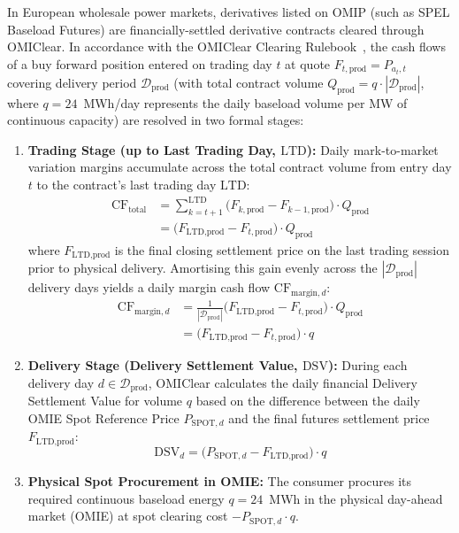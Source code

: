 In European wholesale power markets, derivatives listed on OMIP (such as SPEL Baseload Futures) are financially-settled derivative contracts cleared through OMIClear. In accordance with the OMIClear Clearing Rulebook~\cite{omiclear2023rulebook}, the cash flows of a buy forward position entered on trading day $t$ at quote $F_{t, \text{prod}} = P_{a_t, t}$ covering delivery period $\mathcal{D}_{\text{prod}}$ (with total contract volume $Q_{\text{prod}} = q \cdot |\mathcal{D}_{\text{prod}}|$, where $q = 24$~MWh/day represents the daily baseload volume per MW of continuous capacity) are resolved in two formal stages:
\begin{enumerate}
    \item \textbf{Trading Stage (up to Last Trading Day, $\text{LTD}$):} Daily mark-to-market variation margins accumulate across the total contract volume from entry day $t$ to the contract's last trading day $\text{LTD}$:
    \begin{equation}
    \begin{aligned}
        \text{CF}_{\text{total}} &= \sum_{k=t+1}^{\text{LTD}} \big( F_{k, \text{prod}} - F_{k-1, \text{prod}} \big) \cdot Q_{\text{prod}} \\
        &= \big( F_{\text{LTD}, \text{prod}} - F_{t, \text{prod}} \big) \cdot Q_{\text{prod}}
    \end{aligned}
    \label{eq:cfd_trading_stage}
    \end{equation}
    where $F_{\text{LTD}, \text{prod}}$ is the final closing settlement price on the last trading session prior to physical delivery. Amortising this gain evenly across the $|\mathcal{D}_{\text{prod}}|$ delivery days yields a daily margin cash flow $\text{CF}_{\text{margin}, d}$:
    \begin{equation}
    \begin{aligned}
        \text{CF}_{\text{margin}, d} &= \frac{1}{|\mathcal{D}_{\text{prod}}|} \big( F_{\text{LTD}, \text{prod}} - F_{t, \text{prod}} \big) \cdot Q_{\text{prod}} \\
        &= \big( F_{\text{LTD}, \text{prod}} - F_{t, \text{prod}} \big) \cdot q
    \end{aligned}
    \label{eq:cfd_daily_margin}
    \end{equation}
    \item \textbf{Delivery Stage (Delivery Settlement Value, $\text{DSV}$):} During each delivery day $d \in \mathcal{D}_{\text{prod}}$, OMIClear calculates the daily financial Delivery Settlement Value for volume $q$ based on the difference between the daily OMIE Spot Reference Price $P_{\text{SPOT}, d}$ and the final futures settlement price $F_{\text{LTD}, \text{prod}}$:
    \begin{equation}
        \text{DSV}_d = \big( P_{\text{SPOT}, d} - F_{\text{LTD}, \text{prod}} \big) \cdot q
        \label{eq:cfd_delivery_stage}
    \end{equation}
    \item \textbf{Physical Spot Procurement in OMIE:} The consumer procures its required continuous baseload energy $q = 24$~MWh in the physical day-ahead market (OMIE) at spot clearing cost $-P_{\text{SPOT}, d} \cdot q$.
\end{enumerate}
